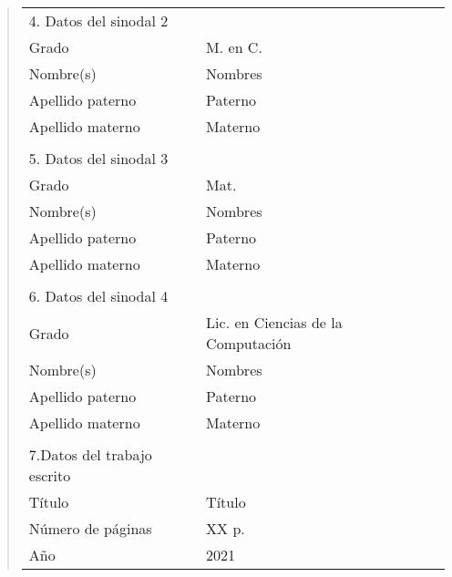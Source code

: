{\begin{quote}
\begin{tabular}{lll}
4. Datos del sinodal 2      & {}                                          \\
Grado                       & M. en C.                                    \\
Nombre(s)                   & Nombres                                     \\
Apellido paterno            & Paterno                                     \\
Apellido materno            & Materno                                     \\
{}                          & {}                                          \\
5. Datos del sinodal 3      & {}                                          \\
Grado                       & Mat.                                        \\
Nombre(s)                   & Nombres                                     \\
Apellido paterno            & Paterno                                     \\
Apellido materno            & Materno                                     \\
{}                          & {}                                          \\
6. Datos del sinodal 4      & {}                                          \\
Grado                       & Lic. en Ciencias de la Computaci\'on        \\
Nombre(s)                   & Nombres                                     \\
Apellido paterno            & Paterno                                     \\
Apellido materno            & Materno                                     \\
{}                          & {}                                          \\
7.Datos del trabajo escrito & {}                                          \\
T\'itulo                    & T\'itulo                                    \\
N\'umero de p\'aginas       & XX p.                                       \\
A\~no                       & 2021                                        \\
\end{tabular}
\end{quote}
}
